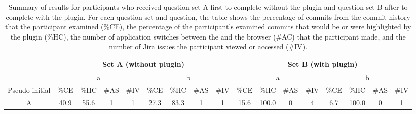 \begin{landscape}
  \begin{table}[p]
    \caption{
      Summary of results for participants who received question set A first to complete without the plugin and question set B after to complete with the plugin.
      For each question set and question, the table shows the percentage of commits from the commit history that the participant examined (\%CE), 
      the percentage of the participant's examined commits that would be or were highlighted by the plugin (\%HC),
      the number of application switches between the  and the browser (\#AC) that the participant made,
      and the number of Jira issues the participant viewed or accessed (\#IV).
    }
    \begin{tabular}{@{}ccccccccccccccccc@{}}
      \toprule
      \multicolumn{1}{l}{}                & \multicolumn{8}{c}{Set A (without plugin)}                                                                                                                  & \multicolumn{8}{c}{Set B (with plugin)}                                                                                                                                                            \\ \midrule
      \multicolumn{1}{c|}{}               & \multicolumn{4}{c|}{a}                         & \multicolumn{4}{c|}{b}                                                                                     & \multicolumn{4}{c|}{a}                                                                 & \multicolumn{4}{c}{b}                                                                                     \\ \midrule
      \multicolumn{1}{c|}{Pseudo-initial} & \%CE & \%HC & \#AS & \multicolumn{1}{l|}{\#IV} & \multicolumn{1}{l}{\%CE} & \multicolumn{1}{l}{\%HC} & \multicolumn{1}{l}{\#AS} & \multicolumn{1}{l|}{\#IV} & \%CE & \multicolumn{1}{l}{\%HC} & \multicolumn{1}{l}{\#AS} & \multicolumn{1}{l|}{\#IV} & \multicolumn{1}{l}{\%CE} & \multicolumn{1}{l}{\%HC} & \multicolumn{1}{l}{\#AS} & \multicolumn{1}{l}{\#IV} \\ \midrule
      \multicolumn{1}{c|}{A}              & 40.9 & 55.6 & 1    & \multicolumn{1}{c|}{1}    & 27.3                     & 83.3                     & 1                        & \multicolumn{1}{c|}{1}    & 15.6 & 100.0                    & 0                        & \multicolumn{1}{c|}{4}    & 6.7                      & 100.0                    & 0                        & 1                        \\

\end{tabular}
\end{table}
\end{landscape}
